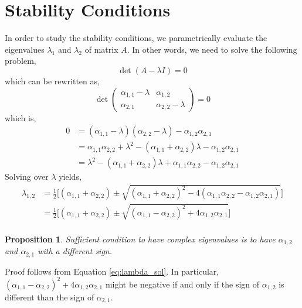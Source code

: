 \documentclass{article}
\newtheorem{prop}{Proposition}
\newenvironment{proof}[1][Proof]{\begin{trivlist}
\item[\hskip \labelsep {\bfseries #1}]}{\end{trivlist}}
\begin{document}
\section{Stability Conditions}

In order to study the stability conditions, we parametrically evaluate the eigenvalues $\lambda_1$ and $\lambda_2$ of matrix $A$. In other words, we need to solve the following problem,
$$
\det(A - \lambda I) = 0
$$
which can be rewritten as,
$$
\det \begin{pmatrix}
\alpha_{1,1} - \lambda & \alpha_{1,2} \\
\alpha_{2,1} & \alpha_{2,2} - \lambda
\end{pmatrix} = 0
$$
which is, 
\begin{equation*}
\begin{aligned}
  0 &= (\alpha_{1,1} - \lambda)(\alpha_{2,2} - \lambda) - \alpha_{1,2}\alpha_{2,1} \\
  &= \alpha_{1,1} \alpha_{2,2} + \lambda^2 - (\alpha_{1,1} + \alpha_{2,2}) \lambda - \alpha_{1,2}\alpha_{2,1} \\
   &= \lambda^2  - (\alpha_{1,1} + \alpha_{2,2}) \lambda + \alpha_{1,1} \alpha_{2,2} - \alpha_{1,2}\alpha_{2,1}
\end{aligned}
\end{equation*}
Solving over $\lambda$ yields,
\begin{equation}\label{eq:lambda_sol}
\begin{aligned}
\lambda_{1,2} &= \frac{1}{2} \bigg[ (\alpha_{1,1} + \alpha_{2,2})  \pm \sqrt{  (\alpha_{1,1} + \alpha_{2,2})^2 - 4(\alpha_{1,1} \alpha_{2,2} - \alpha_{1,2}\alpha_{2,1}) }  \bigg] \\
&= \frac{1}{2} \bigg[ (\alpha_{1,1} + \alpha_{2,2})  \pm \sqrt{  (\alpha_{1,1} - \alpha_{2,2})^2 + 4 \alpha_{1,2}\alpha_{2,1} }  \bigg] \\
\end{aligned}
\end{equation}

\begin{prop}\label{prop:complex_eigen}
Sufficient condition to have complex eigenvalues is to have $\alpha_{1,2}$ and $\alpha_{2,1}$ with a different sign. 
\end{prop}

\begin{proof}
Proof follows from Equation \ref{eq:lambda_sol}. In particular, $(\alpha_{1,1} - \alpha_{2,2})^2 + 4 \alpha_{1,2}\alpha_{2,1}$ might be negative if and only if the sign of $\alpha_{1,2}$ is different than the sign of $\alpha_{2,1}$.
\end{proof}
\end{document}
